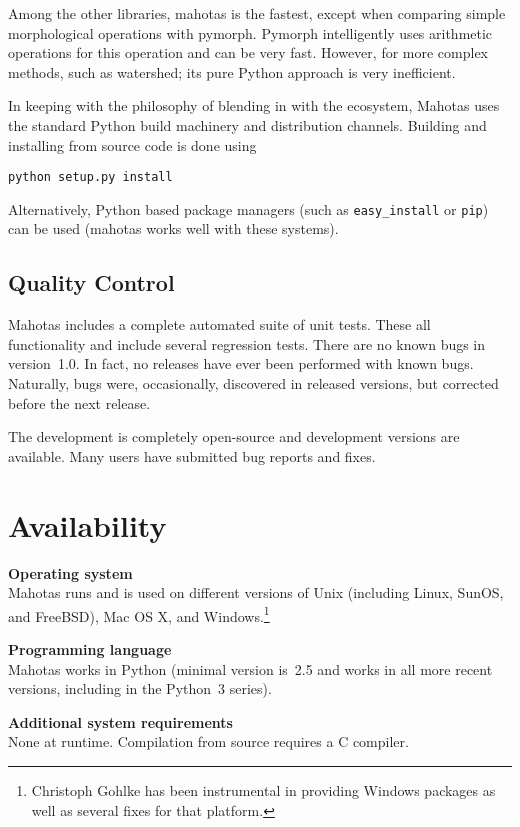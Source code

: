 \documentclass{article}
\newcommand*{\cpp}{{C\nolinebreak[4]\hspace{-.05em}\raisebox{.4ex}{\tiny\textbf{++}}}}
\begin{document}
Among the other libraries, mahotas is the fastest, except when comparing simple
morphological operations with pymorph. Pymorph intelligently uses arithmetic
operations for this operation and can be very fast. However, for more complex
methods, such as watershed; its pure Python approach is very inefficient.

\bigskip

In keeping with the philosophy of blending in with the ecosystem, Mahotas uses
the standard Python build machinery and distribution channels. Building and
installing from source code is done using
\begin{verbatim}
python setup.py install
\end{verbatim}
Alternatively, Python based package managers (such as \texttt{easy\_install} or
\texttt{pip}) can be used (mahotas works well with these systems).

\subsection{Quality Control}

Mahotas includes a complete automated suite of unit tests. These all
functionality and include several regression tests. There are no known bugs in
version~1.0. In fact, no releases have ever been performed with known bugs.
Naturally, bugs were, occasionally, discovered in released versions, but
corrected before the next release.

The development is completely open-source and development versions are
available. Many users have submitted bug reports and fixes.

\section{Availability}

\textbf{Operating system}\\
Mahotas runs and is used on different versions of Unix (including Linux, SunOS,
and FreeBSD), Mac OS X, and Windows.\footnote{Christoph Gohlke has been
instrumental in providing Windows packages as well as several fixes for that
platform.}


\textbf{Programming language}\\
Mahotas works in Python (minimal version is~2.5 and works in all more recent
versions, including in the Python~3 series).

\textbf{Additional system requirements}\\
None at runtime. Compilation from source requires a \cpp{} compiler.
\end{document}

